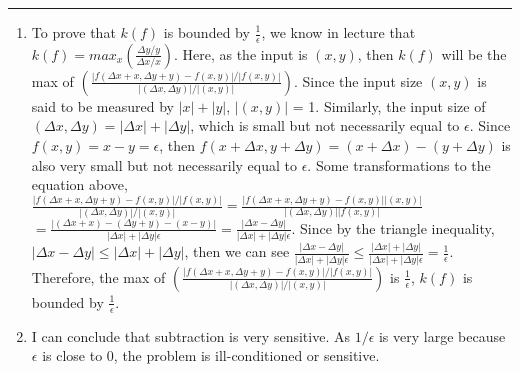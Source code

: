 \documentclass[11pt]{article}
\begin{document}





\begin{quote}

\end{quote}
\hrule


\begin{solution}
\item
\begin{enumerate}
    \item   To prove that $k(f)$ is bounded by  $\frac{1}{\epsilon}$, we know in lecture that $k(f) = max_x (\frac{\Delta y/ y}{\Delta x/ x})$. Here, as the input is $(x,y)$, then $k(f)$ will be the max of $(\frac{|f(\Delta x + x,\Delta y + y) - f(x,y)|/ |f(x,y)|}{|(\Delta x,\Delta y)|/ |(x,y)|})$.\newline
    \newline
    Since the input size $(x,y)$ is said to be measured by $|x| + |y|$, $|(x,y)|$ = 1. Similarly, the input size of $(\Delta x, \Delta y) = |\Delta x| + |\Delta y|$, which is small but not necessarily equal to $\epsilon$. Since $f(x,y) = x - y = \epsilon$, then $f(x + \Delta x, y + \Delta y) = (x + \Delta x) - (y + \Delta y)$ is also very small but not necessarily equal to $\epsilon$.\newline
    \newline
    Some transformations to the equation above, $\frac{|f(\Delta x + x,\Delta y + y)-f(x,y)|/ |f(x,y)|}{|(\Delta x,\Delta y)|/ |(x,y)|} = \frac{|f(\Delta x + x,\Delta y + y)-f(x,y)| |(x,y)|}{|(\Delta x,\Delta y)| |f(x,y)|}$
    \newline
    $= \frac{|(\Delta x + x) - (\Delta y + y) - (x - y)| }{|\Delta x|  + |\Delta y| \epsilon} = \frac{|\Delta x - \Delta y| }{|\Delta x|  + |\Delta y| \epsilon}$. Since by the triangle inequality, $|\Delta x - \Delta y| \leq |\Delta x|  + |\Delta y|$, then we can see $\frac{|\Delta x - \Delta y| }{|\Delta x|  + |\Delta y| \epsilon} \leq \frac{|\Delta x|  + |\Delta y| }{|\Delta x|  + |\Delta y| \epsilon} = \frac{1}{\epsilon}$. Therefore, the max of $(\frac{|f(\Delta x + x,\Delta y + y) - f(x,y)|/ |f(x,y)|}{|(\Delta x,\Delta y)|/ |(x,y)|})$ is $\frac{1}{\epsilon}$, $k(f)$ is bounded by $\frac{1}{\epsilon}$.
    
    
    \item   I can conclude that subtraction is very sensitive. As $1/\epsilon$ is very large because $\epsilon$ is close to $0$, the problem is ill-conditioned or sensitive.
\end{enumerate}

\end{solution}
\end{document}
